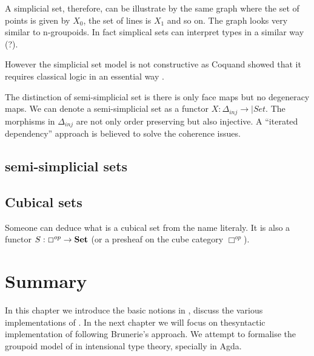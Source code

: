 A simplicial set, therefore, can be illustrate by the same graph where
the set of points is given by $X_0$, the set of lines is $X_1$ and so
on. The graph looks very similar to n-groupoids. In fact simplical
sets can interpret types in a similar way (?).

\fi




However the simplicial set model is not constructive as Coquand showed
that it requires classical logic in an essential way \cite{TC:sset}.


The distinction of semi-simplicial set is there is only face maps
but no degeneracy maps. We can denote a semi-simplicial set as a
functor $X : \Delta_{inj} \rightarrow |Set$. The morphisms in $\Delta_{inj}$ are not only order preserving
but also injective.
A “iterated dependency” approach is believed to solve the coherence
issues.


\subsection{semi-simplicial sets}





\subsection{Cubical sets}

Someone can deduce what is a cubical set from the name literaly. It is
also a functor $S : \Box^{op} \rightarrow \operatorname{\mathbf{Set}}$ (or a presheaf on the
cube category $ \Box^{op}$).

\section{Summary}

In this chapter we introduce the basic notions in \hott, discuss the
various implementations of \hott. In the next chapter we will focus on
thesyntactic implementation of \wog following
Brunerie's approach. We attempt to formalise the groupoid model of
\hott in intensional type theory, specially in Agda.










